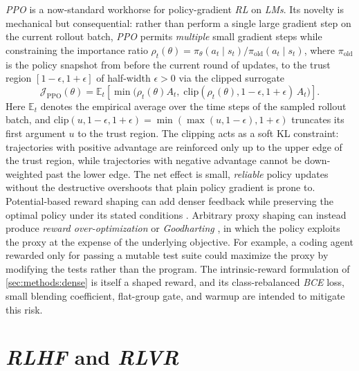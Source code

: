 \documentclass[a4paper,oneside,10pt,english]{scrbook}
\DeclareRobustCommand{\acit}[1]{\textit{\acs{#1}}}
\DeclareRobustCommand{\acfit}[1]{\textit{\ac{#1}}}
\DeclareRobustCommand{\acfpit}[1]{\textit{\acp{#1}}}
\begin{document}
\acfit{PPO} \citep{ppo} is a now-standard workhorse for policy-gradient \acfit{RL} on \acfpit{LM}. Its novelty is mechanical but consequential: rather than perform a single large gradient step on the current rollout batch, \acfit{PPO} permits \emph{multiple} small gradient steps while constraining the importance ratio $\rho_t(\theta) = \pi_\theta(a_t \mid s_t)/\pi_{\mathrm{old}}(a_t \mid s_t)$, where $\pi_{\mathrm{old}}$ is the policy snapshot from before the current round of updates, to the trust region $[1-\epsilon, 1+\epsilon]$ of half-width $\epsilon > 0$ via the clipped surrogate
\begin{equation}
	\mathcal{J}_{\mathrm{PPO}}(\theta) = \mathbb{E}_t\!\left[\min\!\bigl(\rho_t(\theta) A_t,\; \mathrm{clip}(\rho_t(\theta), 1-\epsilon, 1+\epsilon)\, A_t\bigr)\right].
\end{equation}
Here $\mathbb{E}_t$ denotes the empirical average over the time steps of the sampled rollout batch, and $\mathrm{clip}(u, 1-\epsilon, 1+\epsilon) = \min(\max(u, 1-\epsilon), 1+\epsilon)$ truncates its first argument $u$ to the trust region. The clipping acts as a soft KL constraint: trajectories with positive advantage are reinforced only up to the upper edge of the trust region, while trajectories with negative advantage cannot be down-weighted past the lower edge. The net effect is small, \emph{reliable} policy updates without the destructive overshoots that plain policy gradient is prone to. Potential-based reward shaping can add denser feedback while preserving the optimal policy under its stated conditions \citep{rewardshaping}. Arbitrary proxy shaping can instead produce \emph{reward over-optimization} or \textit{Goodharting} \citep{rewardoveropt}, in which the policy exploits the proxy at the expense of the underlying objective. For example, a coding agent rewarded only for passing a mutable test suite could maximize the proxy by modifying the tests rather than the program. The intrinsic-reward formulation of \autoref{sec:methods:dense} is itself a shaped reward, and its class-rebalanced \acfit{BCE} loss, small blending coefficient, flat-group gate, and warmup are intended to mitigate this risk.

\section{\acit{RLHF} and \acit{RLVR}}
\label{sec:bg:rlhf_rlvr}
\end{document}
